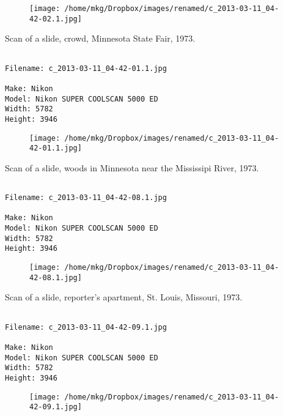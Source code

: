 \begin{figure}
\texttt{[image: /home/mkg/Dropbox/images/renamed/c\_2013-03-11\_04-42-02.1.jpg]}
\end{figure}
    
\clearpage
\onecolumn
\noindent Scan of a slide, crowd, Minnesota State Fair, 1973.
\noindent
\begin{lstlisting}

Filename: c_2013-03-11_04-42-01.1.jpg

Make: Nikon
Model: Nikon SUPER COOLSCAN 5000 ED
Width: 5782
Height: 3946
\end{lstlisting}
\clearpage

\begin{figure}
\texttt{[image: /home/mkg/Dropbox/images/renamed/c\_2013-03-11\_04-42-01.1.jpg]}
\end{figure}
    
\clearpage
\onecolumn
\noindent Scan of a slide, woods in Minnesota near the Mississipi River, 1973.
\noindent
\begin{lstlisting}

Filename: c_2013-03-11_04-42-08.1.jpg

Make: Nikon
Model: Nikon SUPER COOLSCAN 5000 ED
Width: 5782
Height: 3946
\end{lstlisting}
\clearpage

\begin{figure}
\texttt{[image: /home/mkg/Dropbox/images/renamed/c\_2013-03-11\_04-42-08.1.jpg]}
\end{figure}
    
\clearpage
\onecolumn
\noindent Scan of a slide, reporter's apartment, St. Louis, Missouri, 1973.
\noindent
\begin{lstlisting}

Filename: c_2013-03-11_04-42-09.1.jpg

Make: Nikon
Model: Nikon SUPER COOLSCAN 5000 ED
Width: 5782
Height: 3946
\end{lstlisting}
\clearpage

\begin{figure}
\texttt{[image: /home/mkg/Dropbox/images/renamed/c\_2013-03-11\_04-42-09.1.jpg]}
\end{figure}
    
